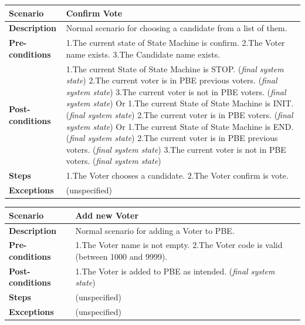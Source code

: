 \documentclass{article}
\begin{document}
\begin{center}
    \begin{tabular}{ | l | p{9cm} |}
    \hline
   \textbf{Scenario}	& \textbf{Confirm Vote}  \\ \hline
    \textbf{Description}	& Normal scenario for choosing a candidate from a list of them.\\ \hline
   \textbf{Pre-conditions}	& 1.The current state of State Machine is confirm.\linebreak
2.The Voter name exists.\linebreak
3.The Candidate name exists.

\\ \hline
 \textbf{Post-conditions} & 1.The current State of State Machine is STOP. (\textit{final system state})\linebreak
2.The current voter is in PBE previous voters. (\textit{final system state})\linebreak
3.The current voter is not in PBE voters. (\textit{final system state})\linebreak
Or\linebreak
1.The current State of State Machine is INIT. (\textit{final system state})\linebreak
2.The current voter is in PBE voters. (\textit{final system state})\linebreak
Or\linebreak
1.The current State of State Machine is END. (\textit{final system state})\linebreak
2.The current voter is in PBE previous voters. (\textit{final system state})\linebreak
3.The current voter is not in PBE voters. (\textit{final system state})
   \\ \hline
   \textbf{Steps} &1.The Voter chooses a candidate.\linebreak
2.The Voter confirm is vote.
 \\ 
    \hline
\textbf{Exceptions}& 	(unspecified)
 \\ 
    \hline
    \end{tabular}
\end{center}

\begin{center}
    \begin{tabular}{ | l | p{9cm} |}
    \hline
   \textbf{Scenario}	& \textbf{Add new Voter }  \\ \hline
    \textbf{Description}	&Normal scenario for adding a Voter to PBE.\\ \hline
   \textbf{Pre-conditions}	&1.The Voter name is not empty.\linebreak
2.The Voter code is valid (between 1000 and 9999).
\\ \hline
 \textbf{Post-conditions} & 1.The Voter is added to PBE as intended. (\textit{final system state}) \\ \hline
   \textbf{Steps} &  (unspecified)
 \\ 
    \hline
\textbf{Exceptions}& 	(unspecified)
 \\ 
    \hline
    \end{tabular}
\end{center}
\end{document}
